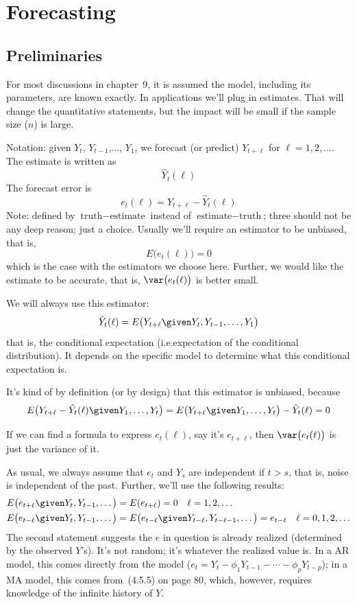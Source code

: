 \documentclass[12pt]{article}
\begin{document}
\section{Forecasting}

\subsection{Preliminaries}

For most discussions in chapter~9,
it is assumed the model, including its parameters, are known exactly.
In applications we'll plug in estimates.
That will change the quantitative statements,
but the impact will be small if the sample size ($n$) is large.

Notation:
given $Y_t$, $Y_{t-1}$,..., $Y_1$,
we forecast (or predict) $Y_{t+\ell}$ for $\ell=1,2,\dotsc$.
The estimate is written as
\[
\hat{Y}_t(\ell)
\]
The forecast error is
\[
e_{t}(\ell) = Y_{t+\ell} - \hat{Y}_{t}(\ell)
\]
Note: defined by
$\text{truth} - \text{estimate}$
instead of $\text{estimate} - \text{truth}$;
three should not be any deep reason; just a choice.
Usually we'll require an estimator to be unbiased, that is,
\[
E\bigl(e_{t}(\ell)\bigr) = 0
\]
which is the case with the estimators we choose here.
Further, we would like the estimate to be accurate, that is,
$\var\bigl(e_{t}(\ell)\bigr)$ is better small.

We will always use this estimator:
\[
\hat{Y}_t(\ell) = E\bigl(Y_{t+\ell} \given Y_t, Y_{t-1},\dotsc,Y_1\bigr)
\]
that is, the conditional expectation (i.e.\@ expectation of the conditional
distribution). It depends on the specific model to determine
what this conditional expectation is.

It's kind of by definition (or by design)
that this estimator is unbiased, because
\[
E\bigl(Y_{t+\ell} - \hat{Y}_t(\ell) \given Y_1,\dotsc,Y_t\bigr)
= E\bigl(Y_{t+\ell} \given Y_1,\dotsc,Y_t\bigr)
  - \hat{Y}_t(\ell)
= 0
\]

If we can find a formula to express $e_t(\ell)$,
say it's $e_{t+\ell}$,
then $\var\bigl(e_t(\ell)\bigr)$ is just the variance of it.

As usual, we always assume that
$e_t$ and $Y_s$ are independent if $t > s$,
that is, noise is independent of the past.
Further, we'll use the following results:
\begin{equation}\label{eq:e-Y}
\begin{split}
E\bigl(e_{t+\ell} \given Y_t,Y_{t-1},\dotsc\bigr)
&= E(e_{t+\ell}) = 0\quad \ell=1,2,\dotsc
\\
E\bigl(e_{t-\ell} \given Y_t,Y_{t-1},\dotsc\bigr)
&= E\bigl(e_{t-\ell} \given Y_{t-\ell},Y_{t-\ell-1},\dotsc\bigr)
    = e_{t-\ell} \quad \ell=0,1,2,\dotsc
\end{split}
\end{equation}
The second statement suggests
the $e$ in question is already realized (determined by the observed
$Y$'s).
It's not random;
it's whatever the realized value is.
In a AR model, this comes directly from the model
($e_t = Y_t - \phi_1 Y_{t-1} - \dotsb - \phi_p Y_{t-p}$);
in a MA model, this comes from~(4.5.5) on page 80,
which, however, requires knowledge of the infinite history
of $Y$.
\end{document}
